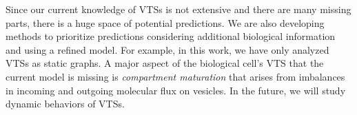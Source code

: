 Since our current knowledge of VTSs is not extensive and there are many missing parts,
there is a huge space of potential predictions.
%
We are also developing methods to prioritize predictions considering additional biological
information and using a refined model.
%
For example, in this work, we have only analyzed VTSs as static graphs. A major aspect of the biological cell’s VTS that the current model is missing is \textit{compartment maturation} that arises from imbalances in incoming and outgoing molecular flux on vesicles.
%
In the future, we will study dynamic behaviors of VTSs.

